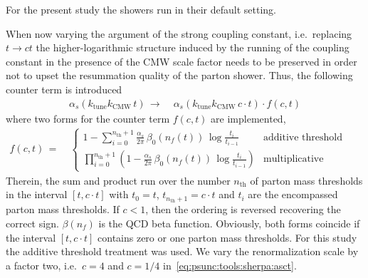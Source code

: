 For the present study the showers run in their default setting.


When now varying the argument of the strong coupling constant, i.e.\ 
replacing $t\to ct$ the higher-logarithmic structure induced by the running 
of the coupling constant in the presence of the CMW scale factor needs to be 
preserved in order not to upset the resummation quality of the parton 
shower. Thus, the following counter term is introduced
\begin{equation}
  \begin{split}\label{eq:psunc:tools:sherpa:asct}
    \alpha_s(k_\text{tune}k_\text{CMW}\,t)
    \,\to\;& \alpha_s(k_\text{tune}k_\text{CMW}\, c\cdot t)\cdot f(c,t)
  \end{split}
\end{equation}
where two forms for the counter term $f(c,t)$ are implemented,
\begin{equation}
  \begin{split}\label{eq:psunc:tools:sherpa:asctfac}
    f(c,t)
    \,=\;&\left\{\begin{array}{ll}
                  1-\sum_{i=0}^{n_\text{th}+1}\frac{\alpha_s}{2\pi}\,\beta_0(n_f(t))\,\log\frac{t_i}{t_{i-1}} & \text{additive threshold treatment}\\
                  \prod_{i=0}^{n_\text{th}+1}\left(1-\frac{\alpha_s}{2\pi}\,\beta_0(n_f(t))\,\log\frac{t_i}{t_{i-1}}\right) & \text{multiplicative threshold treatment.}
                 \end{array}\right.
  \end{split}
\end{equation}
Therein, the sum and product run over the number $n_\text{th}$ of parton mass
thresholds in the interval $[t,c\cdot t]$ with $t_0=t$,
$t_{n_\text{th}+1}=c\cdot t$ and $t_i$ are the encompassed parton mass
thresholds. If $c<1$, then the ordering is reversed recovering the correct
sign. $\beta(n_f)$ is the QCD beta function. Obviously, both forms coincide if
the interval $[t,c\cdot t]$ contains zero or one parton mass thresholds. For
this study the additive threshold treatment was used. We vary the
renormalization scale by a factor two, i.e.\ $c=4$ and $c=1/4$
in~\ref{eq:psunc:tools:sherpa:asct}.

